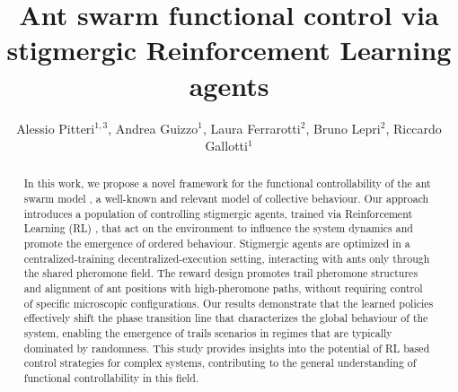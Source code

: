 \documentclass[openacc]{rsproca_new}%
\begin{document}
\title{Ant swarm functional control via stigmergic Reinforcement Learning agents}
\author{Alessio Pitteri$^{1,3}$, Andrea Guizzo$^{1}$, Laura Ferrarotti$^{2}$, Bruno Lepri$^{2}$, Riccardo Gallotti$^{1}$}

\address{$^{1}$CHuB Lab, Fondazione Bruno Kessler, Via Sommarive, 18, Trento, 38123, Italy\\
$^{2}$MobS Lab, Fondazione Bruno Kessler, Via Sommarive, 18, Trento, 38123, Italy\\
$^{3}$City Science Lab, Alma Mater Studiorum Università di Bologna, Viale Carlo Berti Pichat, 6/2, Bologna, 40127, Italy }

\subject{xxxxx, xxxxx, xxxx}






\begin{abstract}
In this work, we propose a novel framework for the functional controllability of the ant swarm model \cite{chialvoswarms,patternformation,SwarmPhaseTrans}, a well-known and relevant model of collective behaviour. Our approach introduces a population of controlling stigmergic agents, trained via Reinforcement Learning (RL) \cite{suttonbarto}, that act on the environment to influence the system dynamics and promote the emergence of ordered behaviour. Stigmergic agents are optimized %
in a centralized-training decentralized-execution setting, interacting with ants only through the shared pheromone field. The reward design promotes trail pheromone structures and alignment of ant positions with high-pheromone paths, without requiring control of specific microscopic configurations. Our results demonstrate that the learned policies effectively shift the phase transition line that characterizes the global behaviour of the system, enabling the emergence of trails scenarios in regimes that are typically dominated by randomness. This study provides insights into the potential of RL based control strategies for complex systems, contributing %
to the general understanding of functional controllability in this field. %
\end{abstract}
\end{document}
